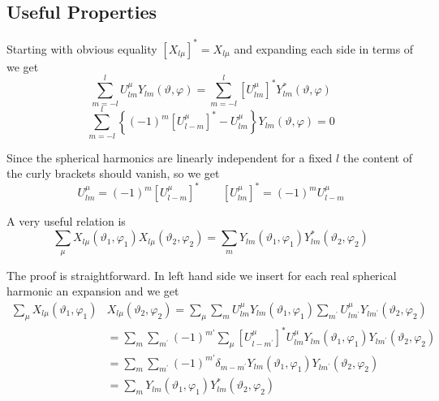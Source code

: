 \subsection{Useful Properties}
\par{Starting with obvious equality $[X_{l\mu}]^{*}=X_{l\mu}$ and expanding each
side in terms of  we get}
\begin{equation*}
\sum_{m=-l}^{l}U_{lm}^{\mu}Y_{lm}(\vartheta,\varphi)=\sum_{m=-l}^{l}[U_{lm}^{\mu}]^{*}Y_{lm}^{*}(\vartheta,\varphi)
\end{equation*}
\begin{equation}
\sum_{m=-l}^{l}\left\{(-1)^m[U_{l-m}^{\mu}]^{*}-U_{lm}^{\mu}\right\}Y_{lm}(\vartheta,\varphi)=0
\end{equation}
\par{Since the spherical harmonics are linearly independent for a fixed $l$ the
content of the curly brackets should vanish, so we get}
\begin{equation}
\label{ulm}
U_{lm}^{\mu}=(-1)^m[U_{l-m}^{\mu}]^{*}\qquad[U_{lm}^{\mu}]^{*}=(-1)^mU_{l-m}^{\mu}
\end{equation}
\par{A very useful relation is}
\begin{equation}
\label{sumxx}
\sum_{\mu}X_{l\mu}(\vartheta_1,\varphi_1)X_{l\mu}(\vartheta_2,\varphi_2)=\sum_{m}Y_{lm}(\vartheta_1,\varphi_1)Y_{lm}^{*}(\vartheta_2,\varphi_2)
\end{equation}
\par{The proof is straightforward. In left hand side we insert for each real
spherical harmonic an expansion  and we get}
\begin{equation}
\begin{split}
\sum_{\mu}X_{l\mu}(\vartheta_1,\varphi_1)&X_{l\mu}(\vartheta_2,\varphi_2)=\sum_{\mu}\sum_{m}U_{lm}^{\mu}Y_{lm}(\vartheta_1,\varphi_1)\sum_{m^{\prime}}U_{lm^{\prime}}^{\mu}Y_{lm^{\prime}}(\vartheta_2,\varphi_2)\\
&=\sum_{m}\sum_{m^{\prime}}(-1)^{m\prime}\sum_{\mu}[U_{l-m^{\prime}}^{\mu}]^{*}U_{lm}^{\mu}Y_{lm}(\vartheta_1,\varphi_1)Y_{lm^{\prime}}(\vartheta_2,\varphi_2)\\
&=\sum_{m}\sum_{m^{\prime}}(-1)^{m\prime}\delta_{m-m^{\prime}}Y_{lm}(\vartheta_1,\varphi_1)Y_{lm^{\prime}}(\vartheta_2,\varphi_2)\\&=\sum_{m}Y_{lm}(\vartheta_1,\varphi_1)Y_{lm}^{*}(\vartheta_2,\varphi_2)
\end{split}
\end{equation}

